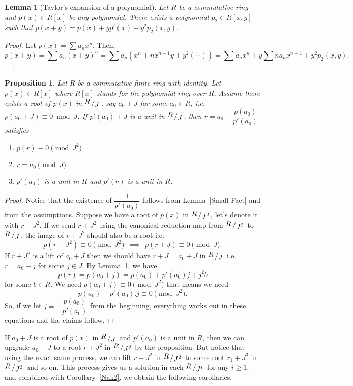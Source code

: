 \documentclass[11pt,reqno]{amsart}
\newtheorem{lem}[thm]{Lemma}
\newtheorem{prop}[thm]{Proposition}
\newcommand{\bigslant}[2]{{\raisebox{.2em}{$#1$}\left/\raisebox{-.2em}{$#2$}\right.}}
\begin{document}
\begin{lem}[Taylor's expansion of a polynomial]\label{Taylor}
Let $R$ be a commutative ring and $p(x) \in R[x]$ be any polynomial. There exists a polynomial $p_2 \in R[x,y]$ such that $p(x+y)=p(x)+yp'(x)+y^2p_2(x,y).$
\end{lem}

\begin{proof}
Let $p(x)=\sum a_{n}x^{n}$. Then, \[ p(x+y)=\sum a_{n}(x+y)^{n}=\sum a_{n}(x^n+nx^{n-1}y+y^2(\cdots))=\sum a_{n}x^n+y\sum na_{n}x^{n-1}+y^2p_2(x,y).\] 
\end{proof}

\begin{prop} \label{Hensel-Jacobson} 
Let $R$ be a commutative finite ring with identity. Let $p(x) \in R[x]$ where $R[x]$ stands for the polynomial ring over $R$. Assume there exists a root of $p(x)$ in $\bigslant{R}{J}$, say $a_0 +J$ for some $a_0 \in R$, i.e. $p(a_0+J) \equiv 0 \bmod J$. If $p'(a_0)+J$ is a unit in $\bigslant{R}{J}$, then $r=a_0- \dfrac{p(a_0)}{p'(a_0)}$ satisfies
\vspace{-0.3cm}
\begin{enumerate}
\item $p(r)  \equiv 0 \pmod{J^2}$
\vspace{-0.3cm}
\item $r=a_0 \pmod{J}$
\vspace{-0.3cm}
\item $p'(a_0)$ is a unit in $R$ and $p'(r)$ is a unit in $R$. 
\end{enumerate}
\end{prop}

\begin{proof} 
Notice that the existence of $\dfrac{1}{p'(a_0)}$ follows from Lemma~\ref{Small Fact} and from the assumptions. Suppose we have a root of $p(x)$ in $\bigslant{R}{J^2}$, let's denote it with $r+J^2$. If we send $r+J^2$ using the canonical reduction map from $\bigslant{R}{J^2}$ to $\bigslant{R}{J}$, the image of $r+J^2$ should also be a root i.e. \[p(r+J^2) \equiv 0 \pmod{J^2} \ \ \implies \ \ p(r+J) \equiv 0 \pmod{J}. \]
If $r+J^2$ is a lift of $a_0+J$ then we should have $r+J=a_0+J$ in $\bigslant{R}{J}$ i.e. $r=a_0+j$ for some $j \in J$. By Lemma~\ref{Taylor}, we have 
\[ p(r)= p(a_0+j)=p(a_0) +p'(a_0) j + j^2 b \]
for some $b \in R$. We need $p(a_0+j) \equiv 0 \pmod{J^2}$ that means we need 
\[p(a_0)+p'(a_0).j \equiv 0 \pmod{J^2}. \]
So, if we let $j=-\dfrac{p(a_0)}{p'(a_0)}$ from the beginning, everything works out in these equations and the claims follow. 
\end{proof}
If $a_0+J$ is a root of $p(x)$ in $\bigslant{R}{J}$ and $p'(a_0)$ is a unit in $R$, then we can upgrade $a_0+J$ to a root $r+J^2$ in $\bigslant{R}{J^2}$ by the proposition. But notice that using the exact same process, we can lift $r+J^2$ in $\bigslant{R}{J^2}$ to some root $r_1+J^3$ in $\bigslant{R}{J^3}$ and so on. This process gives us a solution in each $\bigslant{R}{J^i}$ for any $i \geqslant 1$, and combined with Corollary~\ref{Nak2}, we obtain the following corollaries.
\end{document}

